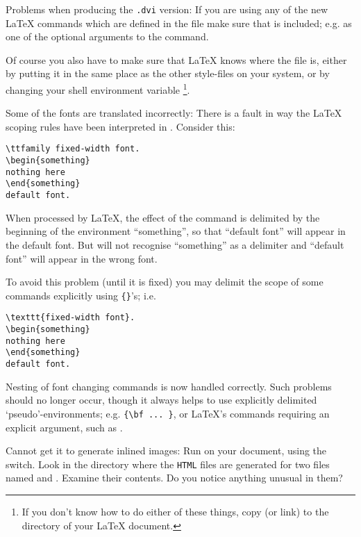 \begin{htmllist}
\item [Problems when producing the \texttt{.dvi} version: \label{htmlsty}]
If you are using any of the new \LaTeX{} commands which are defined in 
the  file make sure that  is included;
e.g. as one of the optional arguments to the  command.

Of course you also have to make sure that \LaTeX{} knows where the 
file is, either by putting it in the same place as the other style-files on
your system, or by changing your  shell environment variable
\footnote{If you don't know how to do either of these things, copy (or
link)  to the directory of your \LaTeX{} document.}.

\item [Some of the fonts are translated incorrectly: ]
There is a fault in way the \LaTeX{} scoping rules have been 
interpreted in \latextohtml. Consider this:
\begin{small}
\begin{verbatim}
\ttfamily fixed-width font.
\begin{something}
nothing here
\end{something}
default font.
\end{verbatim}
\end{small}
When processed by \LaTeX, the effect of the  command is
delimited by the beginning of the environment ``something'',
so that ``default font'' will appear in the default font. 
But \latextohtml{} will not recognise
``something'' as a delimiter and ``default font'' will appear in the
wrong font. 

To avoid this problem (until it is fixed) you may delimit the scope of
some commands explicitly using \verb|{}|'s; i.e.
\begin{small}
\begin{verbatim}
\texttt{fixed-width font}.
\begin{something}
nothing here
\end{something}
default font.
\end{verbatim}
\end{small}


Nesting of font changing commands is now handled correctly.
Such problems should no longer occur, though it always helps
to use explicitly delimited `pseudo'-environments; e.g.
\verb|{\bf ... }|, or \LaTeX's commands requiring an explicit argument,
such as .


\item [Cannot get it to generate inlined images: ]
Run \latextohtml{} on your document, using the  switch.
Look in the directory where the \texttt{HTML} files are generated
for two files named  and .
Examine their contents.
Do you notice anything unusual in them?


\end{htmllist}
